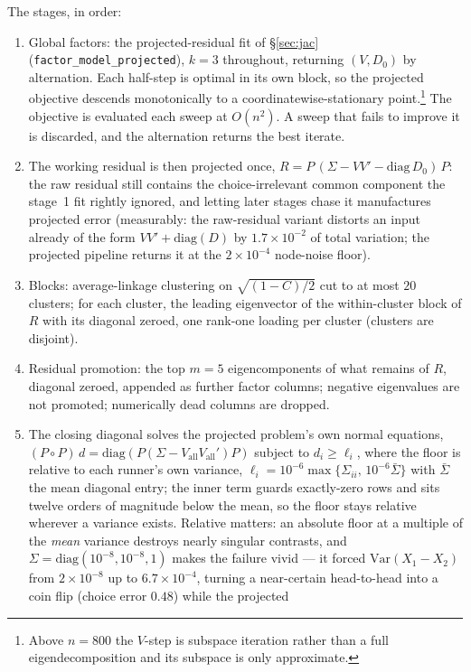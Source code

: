 \documentclass[11pt]{article}
\begin{document}
The stages, in order:
\begin{enumerate}
\item Global factors: the projected-residual fit of \S\ref{sec:jac}
(\texttt{factor\_model\_projected}), $k=3$ throughout, returning $(V,D_0)$
by alternation. Each half-step is optimal in its own block, so the projected objective descends monotonically to a
coordinatewise-stationary point.\footnote{Above $n=800$ the $V$-step is subspace
iteration rather than a full eigendecomposition and its subspace is only
approximate.} The objective is
evaluated each sweep at $O(n^2)$. A sweep that fails to improve it is
discarded, and the alternation returns the best iterate.
\item The working residual is then
projected once, $R=P\,(\Sigma-VV'-\mathrm{diag}\,D_0)\,P$: the raw residual
still contains the choice-irrelevant common component the stage~1 fit
rightly ignored, and letting later stages chase it manufactures projected
error (measurably: the raw-residual variant distorts an input already of the
form $VV'+\mathrm{diag}(D)$ by $1.7\times10^{-2}$ of total variation;
the projected pipeline returns it at the $2\times10^{-4}$ node-noise
floor).
\item Blocks: average-linkage clustering on
$\sqrt{(1-C)/2}$ cut to at most $20$ clusters; for each cluster, the leading
eigenvector of the within-cluster block of $R$ with its diagonal zeroed,
one rank-one loading per cluster (clusters are disjoint).
\item Residual promotion: the top $m=5$ eigencomponents of what remains of $R$, diagonal
zeroed, appended as further factor columns; negative eigenvalues are not
promoted; numerically dead columns are dropped.
\item The closing diagonal
solves the projected problem's own normal equations,
$(P\!\circ\!P)\,d=\mathrm{diag}(P(\Sigma-V_{\mathrm{all}}V_{\mathrm{all}}')P)$
subject to $d_i\ge\ell_i$, where the floor is relative to each runner's
own variance, $\ell_i=10^{-6}\max\{\Sigma_{ii},\,10^{-6}\bar\Sigma\}$
with $\bar\Sigma$ the mean diagonal entry; the inner term guards
exactly-zero rows and sits twelve orders of magnitude below the mean,
so the floor stays relative wherever a variance exists. Relative
matters: an
absolute floor at a multiple of the \emph{mean} variance destroys nearly
singular contrasts, and $\Sigma=\mathrm{diag}(10^{-8},10^{-8},1)$ makes
the failure vivid --- it forced $\mathrm{Var}(X_1-X_2)$ from
$2\times10^{-8}$ up to $6.7\times10^{-4}$, turning a near-certain
head-to-head into a coin flip (choice error $0.48$) while the projected

\end{enumerate}
\end{document}
